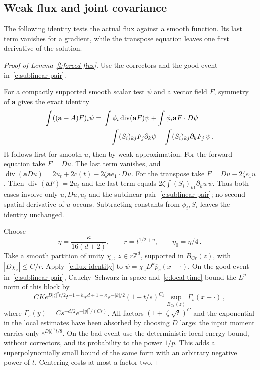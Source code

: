\documentclass[11pt]{amsart}
\theoremstyle{definition}
\theoremstyle{remark}
\numberwithin{equation}{section}
\renewcommand{\a}{\mathbf a}
\newcommand{\diver}{\operatorname{div}}
\begin{document}
\subsection{Weak flux and joint covariance}\label{ss.weak-flux}

The following identity tests the actual flux against a smooth function. Its last term vanishes for a gradient, while the transpose equation leaves one first derivative of the solution.

\begin{proof}[Proof of Lemma~\ref{l:forced-flux}]
Use the correctors and the good event in~\eqref{e:sublinear-pair}.

For a compactly supported smooth scalar test $\psi$ and a vector field $F$, symmetry of $\a$ gives the exact identity
\begin{align}\label{e:flux-identity}
 \int ((\a-A)F)_i\psi
 ={}&\int\phi_i\diver(\a F)\psi
       +\int\phi_i \a F\cdot D\psi\notag\\
    &-\int(S_i)_{kj}F_j\partial_k\psi
       -\int(S_i)_{kj}\partial_kF_j\,\psi \, .
\end{align}
It follows first for smooth $u$, then by weak approximation. For the forward equation take $F=Du$. The last term vanishes, and $\diver(\a Du)=2u_t+2c(t)-2\zeta \a e_1\cdot Du$. For the transpose take $F=Du-2\zeta e_1u$. Then $\diver(\a F)=2u_t$ and the last term equals $2\zeta\int(S_i)_{k1}\partial_ku\,\psi$. Thus both cases involve only $u,Du,u_t$ and the sublinear pair~\eqref{e:sublinear-pair}; no second spatial derivative of $u$ occurs. Subtracting constants from $\phi_i,S_i$ leaves the identity unchanged.

Choose
\begin{equation*}
 \eta=\frac{\kappa}{16(d+2)},\qquad
 r=t^{1/2+\eta},\qquad \eta_0=\eta/4\, .
\end{equation*}
Take a smooth partition of unity $\chi_z$, $z\in r\mathbb Z^d$, supported in $B_{Cr}(z)$, with $|D\chi_z|\leq C/r$. Apply~\eqref{e:flux-identity} to $\psi=\chi_z D^k\overline p_s(x-\cdot)$. On the good event in~\eqref{e:sublinear-pair}, Cauchy--Schwarz in space and~\eqref{e:local-time} bound the $L^p$ norm of this block by
\begin{equation}\label{e:flux-block}
 CK e^{D|\zeta|^2t/2}t^{-1-h}r^{d+1-\kappa}
 s^{-|k|/2}(1+t/s)^{C_k}
 \sup_{B_{Cr}(z)}\Gamma_s(x-\cdot)\, ,
\end{equation}
where $\Gamma_s(y)=Cs^{-d/2}e^{-|y|^2/(Cs)}$. All factors $(1+|\zeta|\sqrt t)^C$ and the exponential in the local estimates have been absorbed by choosing $D$ large: the input moment carries only $e^{D|\zeta|^2t/8}$. On the bad event use the deterministic local energy bound, without correctors, and its probability to the power $1/p$. This adds a superpolynomially small bound of the same form with an arbitrary negative power of $t$. Centering costs at most a factor two.


\end{proof}
\end{document}
